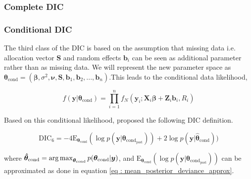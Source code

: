 \subsubsection{Complete DIC}


\subsubsection{Conditional DIC}
The third class of the DIC is based on the assumption that missing data i.e. allocation vector $\boldsymbol{S}$ and random effects $\boldsymbol{b}_i$ can be seen as additional parameter rather than as missing data. We will represent the new parameter space as $\boldsymbol{\theta}_\text{cond} = (\boldsymbol{\beta}, \sigma^2, \boldsymbol{\nu}, \boldsymbol{S}, \boldsymbol{b}_1, \boldsymbol{b}_2, ..., \boldsymbol{b}_n)$.This leads to the conditional data likelihood,

\begin{equation}
\label{eq : conditional_data_likelihood}
f(\boldsymbol{y}|\boldsymbol{\theta}_\text{cond}) = \prod_{i=1}^n f_N(\boldsymbol{y}_i; \boldsymbol{X}_i\boldsymbol{\beta} + \boldsymbol{Z}_i \boldsymbol{b}_i, R_i)
\end{equation}

Based on this conditional likelihood, \citet{celeux_deviance_2006} proposed the following DIC definition.

\begin{equation}
\label{eq : DIC6}
\text{DIC}_6 = -4\text{E}_{\boldsymbol{\theta}_\text{cond}} (\log{p(\boldsymbol{y}|\boldsymbol{\theta}_{\text{cond}_\text{post}})}) + 2\log{p(\boldsymbol{y}|\boldsymbol{\hat{\theta}}_\text{cond})})
\end{equation}

where
$\boldsymbol{\hat{\theta}}_\text{cond} = \operatorname*{arg\,max}_{\boldsymbol{\theta}_\text{cond}}p(\boldsymbol{\theta}_\text{cond}|\boldsymbol{y})$, and $\text{E}_{\boldsymbol{\theta}_\text{cond}} (\log{p(\boldsymbol{y}|\boldsymbol{\theta}_{\text{cond}_\text{post}})})$ can be approximated as done in equation \ref{eq : mean_posterior_deviance_approx}.